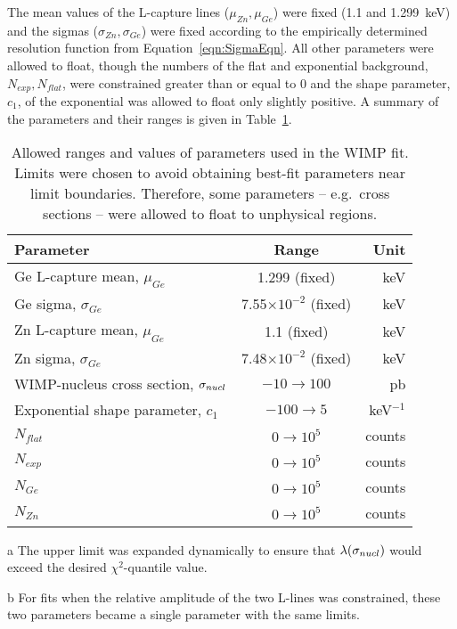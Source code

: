 The mean values of the L-capture lines ($\mu_{Zn}, \mu_{Ge}$) were fixed (1.1 and 1.299~keV) and the sigmas ($\sigma_{Zn}, \sigma_{Ge}$) were fixed according to the empirically determined resolution function from Equation~\ref{eqn:SigmaEqn}.  All other parameters were allowed to float, though the numbers of the flat and exponential background, $N_{exp}, N_{flat}$, were constrained greater than or equal to 0 and the shape parameter, $c_{1}$, of the exponential was allowed to float only slightly positive.  A summary of the parameters and their ranges is given in Table~\ref{tab:WIMPFitParameterRanges}. 
		\begin{table}
			\centering				
			\caption[Allowed ranges and values of parameters used in the WIMP fit]
			{Allowed ranges and values of parameters used in the WIMP fit.  Limits were chosen to avoid obtaining best-fit 	
			parameters near limit boundaries.  Therefore, some parameters -- e.g.~cross sections -- were allowed to float to 
			unphysical regions.}
			\label{tab:WIMPFitParameterRanges}
			\smallskip
			\begin{threeparttable}
				\begin{tabular}{l c r }
				\toprule
				Parameter & Range & Unit \\
				\midrule
				Ge L-capture mean, $\mu_{Ge}$ & 1.299 (fixed) & keV \\
				Ge sigma, $\sigma_{Ge}$ & 7.55$\times10^{-2}$ (fixed) & keV \\				
				Zn L-capture mean, $\mu_{Ge}$ & 1.1 (fixed) & keV \\
				Zn sigma, $\sigma_{Ge}$ & 7.48$\times10^{-2}$ (fixed) & keV \\
				WIMP-nucleus cross section, $\sigma_{nucl}$ & $-10\to100$\tnote{a} & pb \\
				Exponential shape parameter, $c_{1}$ & $-100\to5$ & keV$^{-1}$ \\				
				$N_{flat}$ & $0\to10^{5}$ & counts \\			
				$N_{exp}$ & $0\to10^{5}$ & counts \\	
				$N_{Ge}$\tnote{b} & $0\to10^{5}$ & counts \\			
				$N_{Zn}$\tnote{b} & $0\to10^{5}$ & counts \\						
				\bottomrule
				\end{tabular}		
				 \begin{tablenotes}
				       \item[a] {The upper limit was expanded dynamically to ensure that $\lambda(\sigma_{nucl})$ would exceed
				       the desired $\chi^{2}$-quantile value.}
				       \item[b] { For fits when the relative amplitude of the two L-lines was constrained, these two 
				       parameters became a single parameter with the same limits.}
			     	\end{tablenotes}
			\end{threeparttable}
		\end{table}
